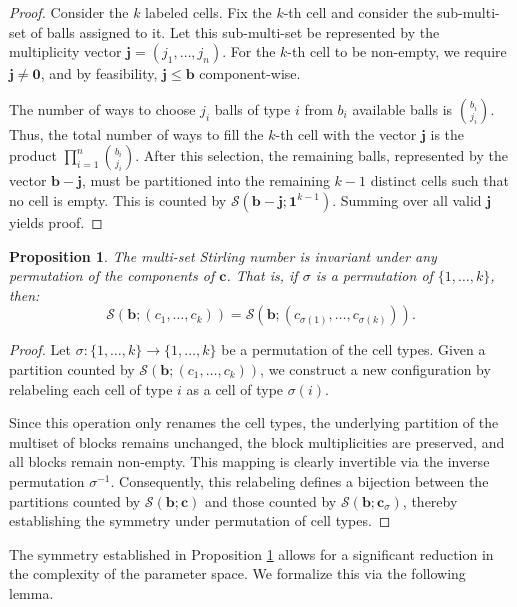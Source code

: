 \documentclass[12pt]{amsart}
\newtheorem{proposition}[theorem]{Proposition}
\theoremstyle{definition}
\begin{document}
\begin{proof}
Consider the $k$ labeled cells. Fix the $k$-th cell and consider the sub-multi-set of balls assigned to it. Let this sub-multi-set be represented by the multiplicity vector $\mathbf{j} = (j_1, \dots, j_n)$. For the $k$-th cell to be non-empty, we require $\mathbf{j} \neq \mathbf{0}$, and by feasibility, $\mathbf{j} \le \mathbf{b}$ component-wise.

The number of ways to choose $j_i$ balls of type $i$ from $b_i$ available balls is $\binom{b_i}{j_i}$. Thus, the total number of ways to fill the $k$-th cell with the vector $\mathbf{j}$ is the product $\prod_{i=1}^n \binom{b_i}{j_i}$. After this selection, the remaining balls, represented by the vector $\mathbf{b} - \mathbf{j}$, must be partitioned into the remaining $k-1$ distinct cells such that no cell is empty. This is counted by $\mathcal{S}(\mathbf{b} - \mathbf{j}; \mathbf{1}^{k-1})$. Summing over all valid $\mathbf{j}$ yields proof.
\end{proof}
\begin{proposition}\label{Cell Shuffle Invariance}
The multi-set Stirling number is invariant under any permutation of the components of $\mathbf{c}$. That is, if $\sigma$ is a permutation of $\{1, \dots, k\}$, then:
\begin{equation}
\mathcal{S}(\mathbf{b}; (c_1, \dots, c_k)) = \mathcal{S}(\mathbf{b}; (c_{\sigma(1)}, \dots, c_{\sigma(k)})).
\end{equation}
\end{proposition}
\begin{proof}
Let $\sigma: \{1, \ldots, k\} \to \{1, \ldots, k\}$ be a permutation of the cell types. Given a partition counted by $\mathcal{S}(\mathbf{b}; (c_1, \ldots, c_k))$, we construct a new configuration by relabeling each cell of type $i$ as a cell of type $\sigma(i)$. 

Since this operation only renames the cell types, the underlying partition of the multiset of blocks remains unchanged, the block multiplicities are preserved, and all blocks remain non-empty. This mapping is clearly invertible via the inverse permutation $\sigma^{-1}$. Consequently, this relabeling defines a bijection between the partitions counted by $\mathcal{S}(\mathbf{b}; \mathbf{c})$ and those counted by $\mathcal{S}(\mathbf{b}; \mathbf{c}_\sigma)$, thereby establishing the symmetry under permutation of cell types.
\end{proof}
The symmetry established in Proposition \ref{Cell Shuffle Invariance} allows for a significant reduction in the complexity of the parameter space. We formalize this via the following lemma.
\end{document}
